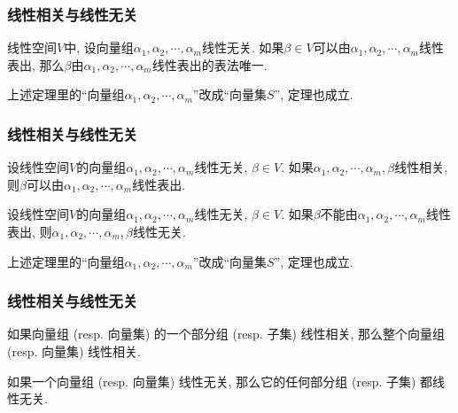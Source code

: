 \documentclass[CJK]{beamer}
\begin{document}
\begin{frame}
	\frametitle{线性相关与线性无关} \pause
	\begin{theorem}
		线性空间$V$中, 设向量组$\alpha_{1}, \alpha_{2}, \cdots, \alpha_{m}$线性无关. 如果$\beta\in V$可以由$\alpha_{1}, \alpha_{2}, \cdots, \alpha_{m}$线性表出, 那么$\beta$由$\alpha_{1}, \alpha_{2}, \cdots, \alpha_{m}$线性表出的表法唯一.
	\end{theorem} \pause
	
	\vspace{2ex}
	
	上述定理里的``向量组$\alpha_{1}, \alpha_{2}, \cdots, \alpha_{m}$''改成``向量集$S$'', 定理也成立.
	
\end{frame}

\begin{frame}
	\frametitle{线性相关与线性无关} \pause
	\begin{theorem}
		设线性空间$V$的向量组$\alpha_{1}, \alpha_{2}, \cdots, \alpha_{m}$线性无关, $\beta\in V$. 如果$\alpha_{1}, \alpha_{2}, \cdots, \alpha_{m}, \beta$线性相关, 则$\beta$可以由$\alpha_{1}, \alpha_{2}, \cdots, \alpha_{m}$线性表出. 
	\end{theorem} \pause
	
	\begin{corollary}
		设线性空间$V$的向量组$\alpha_{1}, \alpha_{2}, \cdots, \alpha_{m}$线性无关, $\beta\in V$. 如果$\beta$不能由$\alpha_{1}, \alpha_{2}, \cdots, \alpha_{m}$线性表出, 则$\alpha_{1}, \alpha_{2}, \cdots, \alpha_{m}, \beta$线性无关.
		\end{corollary} \pause
		
		\vspace{2ex}
		
		上述定理里的``向量组$\alpha_{1}, \alpha_{2}, \cdots, \alpha_{m}$''改成``向量集$S$'', 定理也成立.
\end{frame}

\begin{frame}
	\frametitle{线性相关与线性无关} \pause
	\begin{theorem}
		如果向量组 (resp. 向量集) 的一个部分组 (resp. 子集) 线性相关, 那么整个向量组 (resp. 向量集) 线性相关. \pause
		
		如果一个向量组 (resp. 向量集) 线性无关, 那么它的任何部分组 (resp. 子集) 都线性无关. 
	\end{theorem}
\end{frame}
\end{document}
